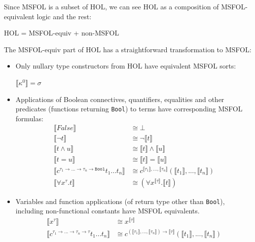 \documentclass{article}
\begin{document}
	Since MSFOL is a subset of 
	HOL, we can see HOL as a 
	composition of 
	MSFOL-equivalent logic 
	and the rest:
	\begin{center}
		HOL = MSFOL-equiv + non-MSFOL 
	\end{center}
	The MSFOL-equiv part of HOL has 
	a straightforward transformation 
	to MSFOL:
	\begin{itemize}
		\item Only nullary type 
		constructors from HOL have
		equivalent MSFOL sorts:
		\begin{center}
			$\llbracket \kappa^{0} 
			\rrbracket = \sigma $
		\end{center}
		\item Applications of 
		Boolean connectives,
		quantifiers, equalities and 
		other predicates (functions 
		returning \texttt{Bool}) to 
		terms have corresponding 
		MSFOL formulas:
		\begin{align*}
		\llbracket False 
		\rrbracket &\cong \bot \\
		\llbracket \neg t \rrbracket 
		&\cong \neg \llbracket t 
		\rrbracket\\
		\llbracket t \land u 
		\rrbracket &\cong \llbracket t 
		\rrbracket \land \llbracket u
		\rrbracket\\
		\llbracket t = u \rrbracket 
		&\cong \llbracket t 
		\rrbracket = \llbracket u
		\rrbracket\\
		\llbracket c^{\tau_1 \to ... 
			\to \tau_n \to \texttt{Bool}} 
		t_1 ... t_n \rrbracket &\cong 
		c^{\llbracket \tau_1 \rrbracket, 
			..., \llbracket \tau_n \rrbracket}
		(\llbracket t_1 \rrbracket, ..., 
		\llbracket t_n \rrbracket)\\
		\llbracket \forall x^{\tau}.t 
		\rrbracket &\cong (\forall 
		x^{\llbracket \tau \rrbracket}.
		\llbracket t \rrbracket)
		\end{align*}
		\item Variables and function 
		applications (of return type 
		other than \texttt{Bool}), 
		including non-functional 
		constants have MSFOL 
		equivalents.
		\begin{align*}
		\llbracket x^{\tau} 
		\rrbracket &\cong 
		x^{\llbracket \tau \rrbracket}\\
		\llbracket c^{\tau_1 \to ... 
			\to \tau_n \to \tau} 
		t_1 ... t_n \rrbracket &\cong 
		c^{(\llbracket \tau_1 \rrbracket, 
			..., \llbracket \tau_n \rrbracket)
			\to \llbracket \tau \rrbracket}
		(\llbracket t_1 \rrbracket, ..., 
		\llbracket t_n \rrbracket)
		\end{align*}
	\end{itemize}
	
\end{document}
